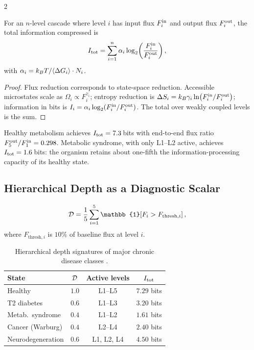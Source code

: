 \begin{multicols}{2}
\begin{theorem}
\label{thm:ch08-compression}
For an $n$-level cascade where level $i$ has input flux $F^{\mathrm{in}}_i$ and output flux $F^{\mathrm{out}}_i$, the total information compressed is
\begin{equation}
I_{\mathrm{tot}} = \sum_{i=1}^{n} \alpha_i \log_2\!\left(\frac{F^{\mathrm{in}}_i}{F^{\mathrm{out}}_i}\right),
\label{eq:ch08-Itot}
\end{equation}
with $\alpha_i = k_B T/\langle\Delta G_i\rangle \cdot N_i$.
\end{theorem}

\begin{proof}
Flux reduction corresponds to state-space reduction. Accessible microstates scale as $\Omega_i \propto F_i^{\gamma_i}$; entropy reduction is $\Delta S_i = k_B\gamma_i\ln(F^{\mathrm{in}}_i/F^{\mathrm{out}}_i)$; information in bits is $I_i = \alpha_i\log_2(F^{\mathrm{in}}_i/F^{\mathrm{out}}_i)$. The total over weakly coupled levels is the sum.
\end{proof}

Healthy metabolism achieves $I_{\mathrm{tot}} = 7.3$\,bits with end-to-end flux ratio $F^{\mathrm{out}}_5/F^{\mathrm{in}}_1 = 0.298$. Metabolic syndrome, with only L1--L2 active, achieves $I_{\mathrm{tot}} = 1.6$\,bits: the organism retains about one-fifth the information-processing capacity of its healthy state.

\subsection{Hierarchical Depth as a Diagnostic Scalar}

\begin{definition}
\label{def:ch08-depth}
\begin{equation}
\Dhier = \frac{1}{5}\sum_{i=1}^{5} \mathbb{1}\!\left[F_i > F_{\mathrm{thresh},i}\right],
\label{eq:ch08-depth}
\end{equation}
where $F_{\mathrm{thresh},i}$ is $10\%$ of baseline flux at level $i$.
\end{definition}

\begin{table}[H]
\centering
\small
\begin{tabular}{lccc}
\toprule
\textbf{State} & $\mathcal{D}$ & \textbf{Active levels} & $I_{\mathrm{tot}}$ \\
\midrule
Healthy & $1.0$ & L1--L5 & $7.29$ bits \\
T2 diabetes & $0.6$ & L1--L3 & $3.20$ bits \\
Metab.\ syndrome & $0.4$ & L1--L2 & $1.61$ bits \\
Cancer (Warburg) & $0.4$ & L2--L4 & $2.40$ bits \\
Neurodegeneration & $0.6$ & L1, L2, L4 & $4.50$ bits \\
\bottomrule
\end{tabular}
\caption{Hierarchical depth signatures of major chronic disease classes \citep{newgard2017, defronzo2009}.}
\label{tab:ch08-depth}
\end{table}


\end{multicols}
